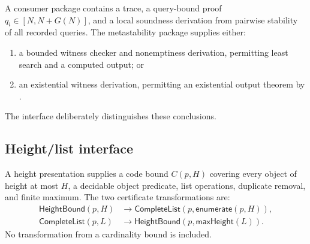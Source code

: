 A consumer package contains a trace, a query-bound proof
\(q_i\in[N,N+G(N)]\), and a local soundness derivation from pairwise stability
of all recorded queries.  The metastability package supplies either:
\begin{enumerate}[label=(\alph*)]
\item a bounded witness checker and nonemptiness derivation, permitting least
      search and a computed output; or
\item an existential witness derivation, permitting an existential output
      theorem by .
\end{enumerate}
The interface deliberately distinguishes these conclusions.

\subsection{Height/list interface}

A height presentation supplies a code bound \(C(p,H)\) covering every object of
height at most \(H\), a decidable object predicate, list operations, duplicate
removal, and finite maximum.  The two certificate transformations are:
\begin{align*}
 \mathsf{HeightBound}(p,H)&\to
 \mathsf{CompleteList}(p,\mathsf{enumerate}(p,H)),\\
 \mathsf{CompleteList}(p,L)&\to
 \mathsf{HeightBound}(p,\mathsf{maxHeight}(L)).
\end{align*}
No transformation from a cardinality bound is included.
